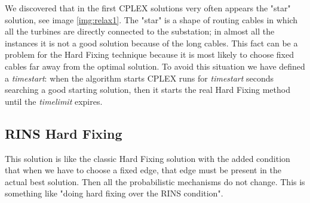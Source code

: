 We discovered that in the first \textsc{CPLEX} solutions very often appears the "star" solution, see image \ref{img:relax1}. The "star" is a shape of routing cables in which all the turbines are directly connected to the substation; in almost all the instances it is not a good solution because of the long cables. This fact can be a problem for the Hard Fixing technique because it is most likely to choose fixed cables far away from the optimal solution. To avoid this situation we have defined a \textit{timestart}: when the algorithm starts \textsc{CPLEX} runs for \textit{timestart} seconds searching a good starting solution, then it starts the real Hard Fixing method until the \textit{timelimit} expires. 

\subsection{RINS Hard Fixing}
This solution is like the classic Hard Fixing solution with the added condition that when we have to choose a fixed edge, that edge must be present in the actual best solution. Then all the probabilistic mechanisms do not change. This is something like "doing hard fixing over the RINS condition". 


